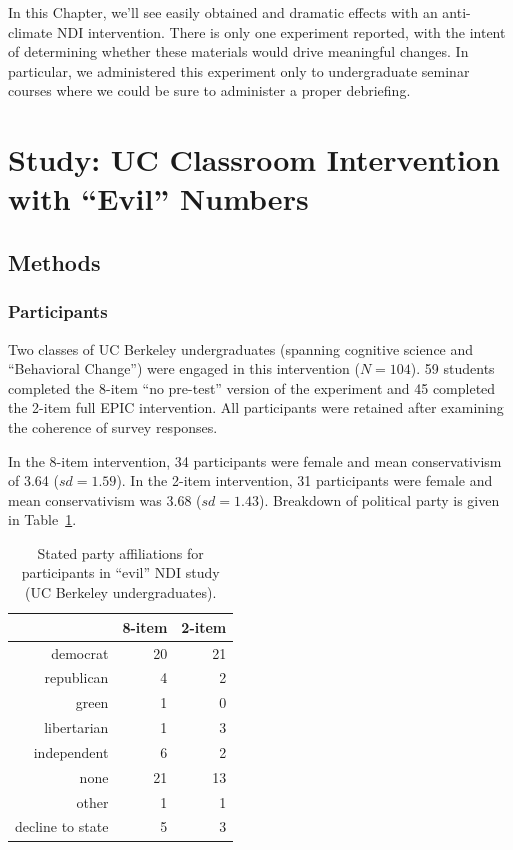 In this Chapter, we'll see easily obtained and dramatic effects with an
anti-climate NDI intervention. There is only one experiment reported, with the
intent of determining whether these materials would drive meaningful
changes. In particular, we administered this experiment only to undergraduate
seminar courses where we could be sure to administer a proper debriefing.

\section{Study: UC Classroom Intervention with \texorpdfstring{“Evil”}{"Evil"}
    Numbers}

\subsection{Methods} 
\label{sec:evilndi-methods}

\subsubsection{Participants}
\label{sec:evil-participants}

Two classes of UC Berkeley undergraduates (spanning cognitive science and
“Behavioral Change”) were engaged in this intervention ($N=104$). 59 students
completed the 8-item “no pre-test” version of the experiment and 45 completed
the 2-item full EPIC intervention. All participants were retained after
examining the coherence of survey responses.

In the 8-item intervention, 34 participants were female and mean conservativism
of 3.64 ($sd=1.59$). In the 2-item intervention, 31 participants were female and
mean conservativism was 3.68 ($sd=1.43$). Breakdown of political party is given
in Table~\ref{table:evil-party}.

\begin{table}[ht]
\caption{Stated party affiliations for participants in “evil” NDI study (UC
    Berkeley undergraduates).}
\label{table:evil-party}
\centering
\begin{tabular}{rrr}
  \toprule
     & 8-item & 2-item \\ 
  \midrule
  democrat &  20 &  21 \\ 
  republican &   4 &   2 \\ 
  green &   1 &   0 \\ 
  libertarian &   1 &   3 \\ 
  independent &   6 &   2 \\ 
  none &  21 &  13 \\ 
  other &   1 &   1 \\ 
  decline to state &   5 &   3 \\ 
   \bottomrule
\end{tabular}
\end{table}

